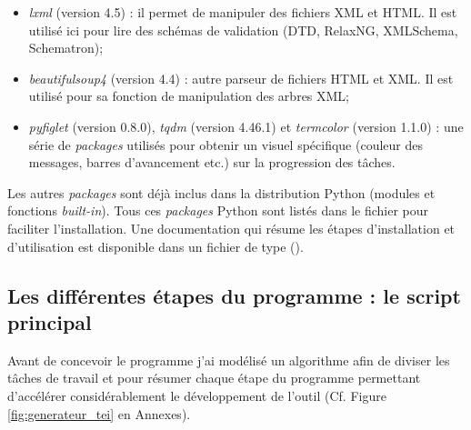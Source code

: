 \begin{itemize}
    \item \textit{lxml} (version 4.5) : il permet de manipuler des fichiers XML et HTML. Il est utilisé ici pour lire des schémas de validation (DTD, RelaxNG, XMLSchema, Schematron);
    \item \textit{beautifulsoup4} (version 4.4) : autre parseur de fichiers HTML et XML. Il est utilisé pour sa fonction de manipulation des arbres XML;
    \item \textit{pyfiglet} (version 0.8.0), \textit{tqdm} (version 4.46.1) et \textit{termcolor} (version 1.1.0) : une série de \textit{packages} utilisés pour obtenir un visuel spécifique (couleur des messages, barres d'avancement etc.) sur la progression des tâches.
\end{itemize}
\bigskip
Les autres \textit{packages} sont déjà inclus dans la distribution Python (modules et fonctions \textit{built-in}). Tous ces \textit{packages} Python sont listés dans le fichier  pour faciliter l'installation. Une documentation qui résume les étapes d'installation et d'utilisation est disponible dans un fichier de type  ().\\

\subsection{Les différentes étapes du programme : le script principal }

Avant de concevoir le programme j'ai modélisé un algorithme afin de diviser les tâches de travail et pour résumer chaque étape du programme permettant d'accélérer considérablement le développement de l'outil (Cf. Figure \ref{fig:generateur_tei} en Annexes).\\

